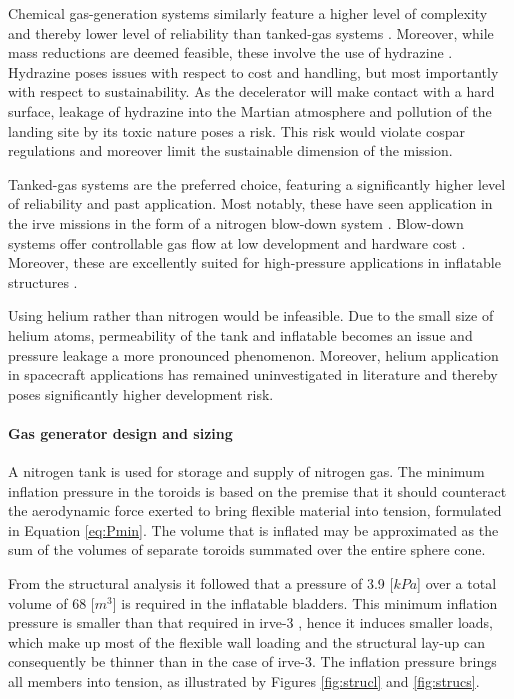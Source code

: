 Chemical gas-generation systems similarly feature a higher level of complexity and thereby lower level of reliability than tanked-gas systems \cite{Jenkins2001}. Moreover, while mass reductions are deemed feasible, these involve the use of hydrazine \cite{Jenkins2001, Freeland1998}. Hydrazine poses issues with respect to cost and handling, but most importantly with respect to sustainability. As the decelerator will make contact with a hard surface, leakage of hydrazine into the Martian atmosphere and pollution of the landing site by its toxic nature poses a risk. This risk would violate \gls{cospar} regulations and moreover limit the sustainable dimension of the mission.

Tanked-gas systems are the preferred choice, featuring a significantly higher level of reliability and past application. Most notably, these have seen application in the \gls{irve} missions in the form of a nitrogen blow-down system \cite{Smith2010}. Blow-down systems offer controllable gas flow at low development and hardware cost \cite{Freeland1998}. Moreover, these are excellently suited for high-pressure applications in inflatable structures \cite{Jenkins2001}.

Using helium rather than nitrogen would be infeasible. Due to the small size of helium atoms, permeability of the tank and inflatable becomes an issue and pressure leakage a more pronounced phenomenon. Moreover, helium application in spacecraft applications has remained uninvestigated in literature and thereby poses significantly higher development risk.


\paragraph{Gas generator design and sizing}
A nitrogen tank is used for storage and supply of nitrogen gas. The minimum inflation pressure in the toroids is based on the premise that it should counteract the aerodynamic force exerted to bring flexible material into tension, formulated in Equation \ref{eq:Pmin}. The volume that is inflated may be approximated as the sum of the volumes of separate toroids summated over the entire sphere cone.

From the structural analysis it followed that a pressure of 3.9 [$kPa$] over a total volume of 68 [$m^{3}$] is required in the inflatable bladders. This minimum inflation pressure is smaller than that required in \gls{irve}-3 \cite{Jurewicz2011}, hence it induces smaller loads, which make up most of the flexible wall loading and the structural lay-up can consequently be thinner than in the case of \gls{irve}-3. The inflation pressure brings all members into tension, as illustrated by Figures \ref{fig:strucl} and \ref{fig:strucs}.

